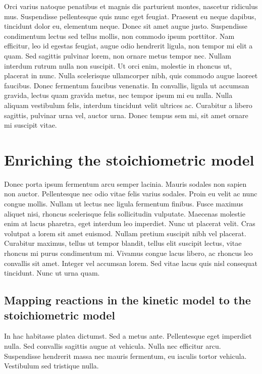 \documentclass[parskip=full]{scrreprt}
\begin{document}
Orci varius natoque penatibus et magnis dis parturient montes, nascetur ridiculus mus. Suspendisse pellentesque quis nunc eget feugiat. Praesent eu neque dapibus, tincidunt dolor eu, elementum neque. Donec sit amet augue justo. Suspendisse condimentum lectus sed tellus mollis, non commodo ipsum porttitor. Nam efficitur, leo id egestas feugiat, augue odio hendrerit ligula, non tempor mi elit a quam. Sed sagittis pulvinar lorem, non ornare metus tempor nec. Nullam interdum rutrum nulla non suscipit. Ut orci enim, molestie in rhoncus ut, placerat in nunc. Nulla scelerisque ullamcorper nibh, quis commodo augue laoreet faucibus. Donec fermentum faucibus venenatis. In convallis, ligula ut accumsan gravida, lectus quam gravida metus, nec tempor ipsum mi eu nulla. Nulla aliquam vestibulum felis, interdum tincidunt velit ultrices ac. Curabitur a libero sagittis, pulvinar urna vel, auctor urna. Donec tempus sem mi, sit amet ornare mi suscipit vitae.

\chapter{Enriching the stoichiometric model}
\label{ch:stoich}

Donec porta ipsum fermentum arcu semper lacinia. Mauris sodales non sapien non auctor. Pellentesque nec odio vitae felis varius sodales. Proin eu velit ac nunc congue mollis. Nullam ut lectus nec ligula fermentum finibus. Fusce maximus aliquet nisi, rhoncus scelerisque felis sollicitudin vulputate. Maecenas molestie enim at lacus pharetra, eget interdum leo imperdiet. Nunc ut placerat velit. Cras volutpat a lorem sit amet euismod. Nullam pretium suscipit nibh vel placerat. Curabitur maximus, tellus ut tempor blandit, tellus elit suscipit lectus, vitae rhoncus mi purus condimentum mi. Vivamus congue lacus libero, ac rhoncus leo convallis sit amet. Integer vel accumsan lorem. Sed vitae lacus quis nisl consequat tincidunt. Nunc ut urna quam. 

\section{Mapping reactions in the kinetic model to the stoichiometric model}
\label{sec:mapping}

In hac habitasse platea dictumst. Sed a metus ante. Pellentesque eget imperdiet nulla. Sed convallis sagittis augue at vehicula. Nulla nec efficitur arcu. Suspendisse hendrerit massa nec mauris fermentum, eu iaculis tortor vehicula. Vestibulum sed tristique nulla.
\end{document}
